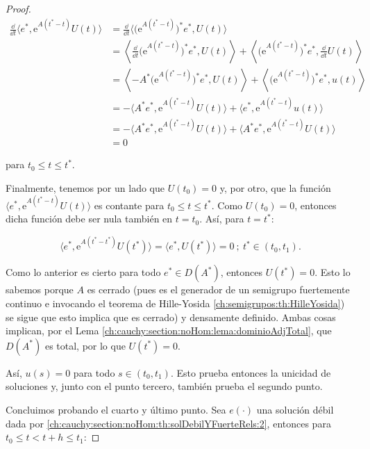 \begin{proof}
    \begin{align*}
        \frac{\dd}{\dd t} \langle e^*, \mathrm{e}^{A(t^* - t)}U(t) \rangle &= \frac{\dd}{\dd t}\Big\langle \big(\mathrm{e}^{A(t^*-t)} \big)^*e^*,U(t)\Big\rangle \\
        &= \left \langle \frac{\dd}{\dd t}\big(\mathrm{e}^{A(t^*-t)} \big)^*e^*, U(t) \right \rangle + \left\langle \big(\mathrm{e}^{A(t^*-t)} \big)^*e^*,\frac{\dd}{\dd t}U(t)\right\rangle\\
        &= \left \langle - A^*\big(\mathrm{e}^{A(t^*-t)} \big)^*e^*, U(t) \right \rangle + \left\langle \big(\mathrm{e}^{A(t^*-t)} \big)^*e^*, u(t)\right\rangle \\
        &= - \langle A^* e^*, \mathrm{e}^{A(t^* - t)}U(t) \rangle + \langle e^*, \mathrm{e}^{A(t^* - t)} u(t) \rangle\\
        &= - \langle A^* e^*, \mathrm{e}^{A(t^* - t)}U(t) \rangle + \langle A^* e^*, \mathrm{e}^{A(t^* - t)} U(t) \rangle\\
        &= 0
    \end{align*}

    para $t_0 \leq t \leq t^*$.

    Finalmente, tenemos por un lado que $U(t_0) = 0$ y, por otro, que la función $\langle e^*, \mathrm{e}^{A(t^* - t)}U(t) \rangle$ es contante para $t_0 \leq t \leq t^*$. Como $U(t_0) = 0$, entonces dicha función debe ser nula también en $t = t_0$. Así, para $t = t^*$:

    \[\langle e^*, \mathrm{e}^{A(t^* - t^*)}U(t^*) \rangle = \langle e^*, U(t^*) \rangle = 0 \ ; \ t^* \in (t_0, t_1).\]

    Como lo anterior es cierto para todo $e^* \in D(A^*)$, entonces $U(t^*) =0$. Esto lo sabemos porque $A$ es cerrado (pues es el generador de un semigrupo fuertemente continuo e invocando el teorema de Hille-Yosida \ref{ch:semigrupos:th:HilleYosida}) se sigue que esto implica que es cerrado) y densamente definido. Ambas cosas implican, por el Lema \ref{ch:cauchy:section:noHom:lema:dominioAdjTotal}, que $D(A^*)$ es total, por lo que $U(t^*) = 0$.
    
    Así, $u(s) = 0$ para todo $s \in (t_0, t_1)$. Esto prueba entonces la unicidad de soluciones y, junto con el punto tercero, también prueba el segundo punto.

    Concluimos probando el cuarto y último punto. Sea $e(\cdot)$ una solución débil dada por \eqref{ch:cauchy:section:noHom:th:solDebilYFuerteRels:2}, entonces para $t_0 \leq t < t + h \leq t_1$:


\end{proof}
